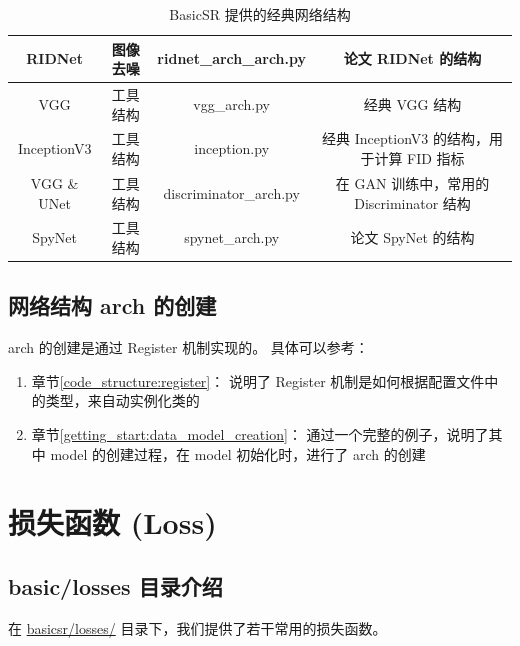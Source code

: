 \documentclass[../main.tex]{subfiles}
\begin{document}
\begin{table}[h]
{\begin{tabular}{|c|c|c|c|}
            RIDNet            & 图像去噪      & ridnet\_arch\_arch.py  & 论文 RIDNet 的结构                       \\ \hline
            VGG               & 工具结构      & vgg\_arch.py           & 经典 VGG 结构                            \\ \hline
            InceptionV3       & 工具结构      & inception.py           & 经典 InceptionV3 的结构，用于计算 FID 指标 \\ \hline
            VGG \& UNet       & 工具结构      & discriminator\_arch.py & 在 GAN 训练中，常用的 Discriminator 结构   \\ \hline
            SpyNet            & 工具结构      & spynet\_arch.py        & 论文 SpyNet 的结构                       \\ \hline
        \end{tabular}
    }
    \caption{BasicSR 提供的经典网络结构}
\end{table}

\subsection{网络结构 arch 的创建}\label{code_structure:arch_creation}

arch 的创建是通过 Register 机制实现的。
具体可以参考：
\begin{enumerate}
    \item 章节\ref{code_structure:register}： 说明了 Register 机制是如何根据配置文件中的类型，来自动实例化类的
    \item 章节\ref{getting_start:data_model_creation}： 通过一个完整的例子，说明了其中 model 的创建过程，在 model 初始化时，进行了 arch 的创建
\end{enumerate}

\section{损失函数 (Loss)}\label{code_structure:loss}

\subsection{basic/losses 目录介绍}\label{code_structure:loss_contents}
在 \href{https://github.com/XPixelGroup/BasicSR/tree/master/basicsr/losses}{basicsr/losses/} 目录下，我们提供了若干常用的损失函数。
\end{document}
